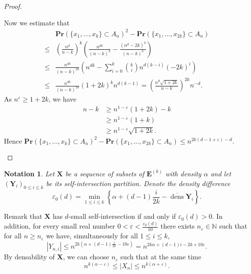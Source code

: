 \documentclass{article}
\DeclareMathOperator{\dens}{dens}
\newcommand{\bs}{\boldsymbol}
\def\Pr{\mathbf{Pr}}
\newtheorem*{nota}{Notation}
\theoremstyle{remark}
\begin{document}
\begin{proof}
\begin{enumerate}[(i)]
    Now we estimate that
    \begin{align*}&\Pr(\{x_1,\dots,x_k\}\subset A_n)^2- \Pr(\{x_1,\dots,x_{2k}\}\subset A_n) \\
    \leq & \left(\frac{n^d}{n-k}\right)^k\left(\frac{n^{dk}}{(n-k)^k} - \frac{(n^d-2k)^k}{(n-k)^k}\right) \\ 
    \leq & \frac{n^{dk}}{(n-k)^{2k}}\left(n^{dk} - \sum_{i=0}^k\binom{k}{i}n^{d(k-i)}(-2k)^i\right) \\
    \leq & \frac{n^{dk}}{(n-k)^{2k}}(1+2k)^kn^{d(k-1)} = \left(\frac{n^d\sqrt{1+2k}}{n-k}\right)^{2k}n^{-d}.
    \end{align*}
    As $n^\varepsilon\geq 1+2k$, we have
    \begin{align*}
        n-k & \geq n^{1-\varepsilon}(1+2k)-k\\
        & \geq n^{1-\varepsilon}(1+k)\\
        & \geq n^{1-\varepsilon}\sqrt{1+2k}.
    \end{align*}
    Hence $\Pr(\{x_1,\dots,x_k\}\subset A_n)^2 - \Pr(\{x_1,\dots,x_{2k}\}\subset A_n) \leq n^{2k(d-1+\varepsilon)-d}$. 
\end{enumerate}
\end{proof}

\begin{nota}Let $\bs X$ be a sequence of subsets of $\bs E^{(k)}$ with density $\alpha$ and let $(\bs Y_i)_{0\leq i \leq k}$ be its self-intersection partition. Denote the density difference
\[\varepsilon_0(d) = \min_{1\leq i \leq k}\left\{\alpha + (d-1)\frac{i}{2k}-\overline{\dens} \bs Y_i\right\}.\]
\end{nota}
Remark that $\bs X$ has $d$-small self-intersection if and only if $\varepsilon_0(d)>0$. In addition, for every small real number $0<\varepsilon<\frac{\varepsilon_0(d)}{10}$ there exists $n_\varepsilon\in \mathbb{N}$ such that for all $n\geq n_\varepsilon$ we have, simultaneously for all $1\leq i \leq k$,
\[|Y_{n,i}|\leq n^{2k\left(\alpha+(d-1)\frac{i}{2k}-10\varepsilon\right)} = n^{2k\alpha + (d-1)i-2k\times 10\varepsilon}.\]
By densability of $\bs X$, we can choose $n_\varepsilon$ such that at the same time 
\[n^{k(\alpha-\varepsilon)}\leq |X_n|\leq n^{k(\alpha+\varepsilon)}.\]
\end{document}
